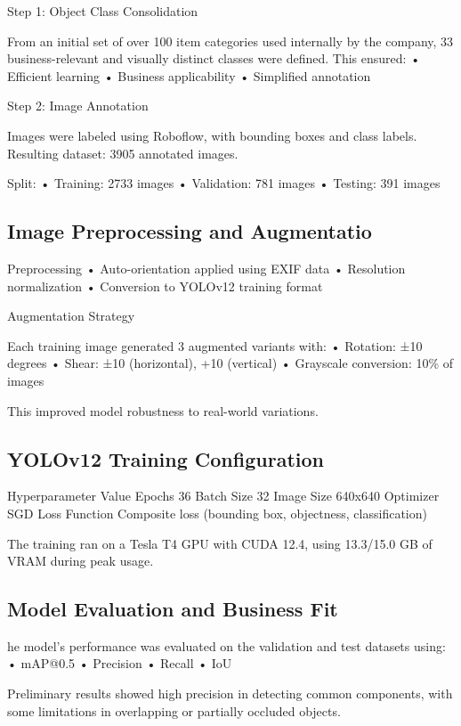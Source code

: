 \documentclass[a4paper,10pt,twocolumn]{article}
\numberwithin{figure}{section}
\numberwithin{table}{section}
\begin{document}

Step 1: Object Class Consolidation

From an initial set of over 100 item categories used internally by the company, 33 business-relevant and visually distinct classes were defined. This ensured:
	•	Efficient learning
	•	Business applicability
	•	Simplified annotation

    Step 2: Image Annotation

Images were labeled using Roboflow, with bounding boxes and class labels. Resulting dataset: 3905 annotated images.

Split:
	•	Training: 2733 images
	•	Validation: 781 images
	•	Testing: 391 images

\subsection{Image Preprocessing and Augmentatio}

Preprocessing
	•	Auto-orientation applied using EXIF data
	•	Resolution normalization
	•	Conversion to YOLOv12 training format

Augmentation Strategy

Each training image generated 3 augmented variants with:
	•	Rotation: ±10 degrees
	•	Shear: ±10 (horizontal), +10 (vertical)
	•	Grayscale conversion: 10\% of images

This improved model robustness to real-world variations.


\subsection{YOLOv12 Training Configuration}

Hyperparameter
Value
Epochs
36
Batch Size
32
Image Size
640x640
Optimizer
SGD
Loss Function
Composite loss (bounding box, objectness, classification)

The training ran on a Tesla T4 GPU with CUDA 12.4, using 13.3/15.0 GB of VRAM during peak usage.

\subsection{Model Evaluation and Business Fit}

he model’s performance was evaluated on the validation and test datasets using:
	•	mAP@0.5
	•	Precision
	•	Recall
	•	IoU

Preliminary results showed high precision in detecting common components, with some limitations in overlapping or partially occluded objects.
\end{document}
